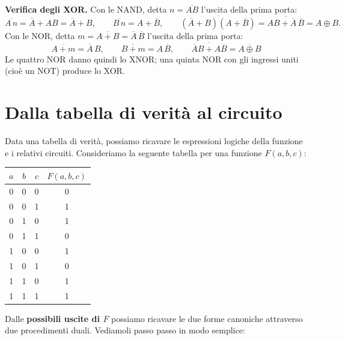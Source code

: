 \noindent\textbf{Verifica degli XOR.} Con le NAND, detta $n=\overline{AB}$ l'uscita della prima porta:
\[
\overline{A\,n}=\overline{A}+AB=\overline{A}+B,\qquad
\overline{B\,n}=A+\overline{B},\qquad
\overline{(\overline{A}+B)(A+\overline{B})}=\overline{AB+\overline{A}\,\overline{B}}=A\oplus B .
\]
Con le NOR, detta $m=\overline{A+B}=\overline{A}\,\overline{B}$ l'uscita della prima porta:
\[
\overline{A+m}=\overline{A}\,B,\qquad
\overline{B+m}=A\,\overline{B},\qquad
\overline{\overline{A}B+A\overline{B}}=\overline{A\oplus B}
\]
Le quattro NOR danno quindi lo XNOR; una quinta NOR con gli ingressi uniti (cioè un NOT) produce lo XOR.

\section{Dalla tabella di verità al circuito}

Data una tabella di verità, possiamo ricavare le espressioni logiche della funzione e i relativi circuiti. Consideriamo la seguente tabella per una funzione $F(a,b,c)$:

\begin{center}
\begin{tabular}{ccc|c}
\toprule
$a$ & $b$ & $c$ & $F(a,b,c)$\\
\midrule
0&0&0&0\\
0&0&1&1\\
0&1&0&1\\
0&1&1&0\\
1&0&0&1\\
1&0&1&0\\
1&1&0&1\\
1&1&1&1\\
\bottomrule
\end{tabular}
\end{center}

Dalle \textbf{possibili uscite di $F$} possiamo ricavare le due forme canoniche attraverso due procedimenti duali. Vediamoli passo passo in modo semplice:

